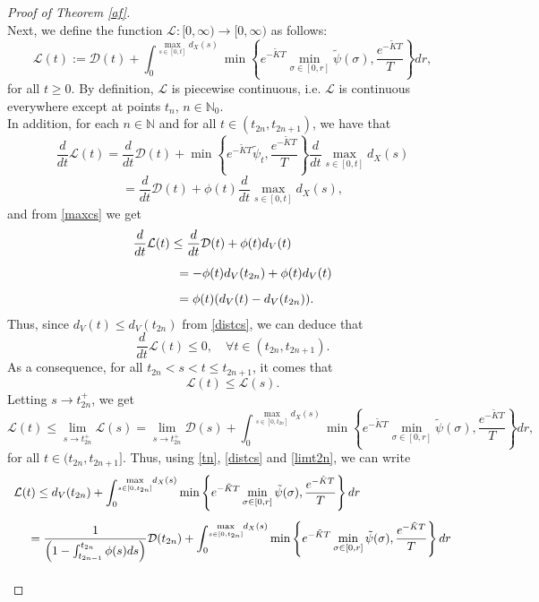 \documentclass[a4paper,11pt,oneside]{article}
\begin{document}
\begin{proof}[Proof of Theorem \ref{af}]
\begin{equation}
	\end{equation}
	Next, we define the function $\mathcal{L}:[0,\infty)\rightarrow [0,\infty)$ as follows: $$\mathcal{L}(t):=\mathcal{D}(t)+\int_{0}^{\underset{s\in [0,t]}{\max}d_{X}(s)}\min\left\{e^{- \tilde KT}\min_{\sigma\in [0,r]}\tilde \psi(\sigma),\frac{e^{-\tilde KT}}{T}\right\}dr,$$
	for all $t\geq0$. By definition, $\mathcal{L}$ is piecewise continuous, i.e. $\mathcal{L}$ is continuous everywhere except at points $t_n$, $n\in \mathbb{N}_0$. \\In addition, for each $n\in \mathbb{N}$ and for all $t\in(t_{2n},t_{2n+1}) $, we have that $$\frac{d}{dt}\mathcal{L}(t)=\frac{d}{dt}\mathcal{D}(t)+\min\left\{e^{-\tilde KT}\tilde \psi_{t},\frac{e^{-\tilde KT}}{T}\right\}\frac{d}{dt}\underset{s\in [0,t]}{\max}d_{X}(s)$$$$=\frac{d}{dt}\mathcal{D}(t)+\phi(t)\frac{d}{dt}\underset{s\in [0,t]}{\max}d_{X}(s),$$
	and from \eqref{maxcs} we get $$\begin{array}{l}
		\vspace{0.3cm}\displaystyle{\frac{d}{dt}\mathcal{L}(t)\leq \frac{d}{dt}\mathcal{D}(t)+\phi(t)d_{V}(t)}\\
		\vspace{0.3cm}\displaystyle{\hspace{1.3cm}=-\phi(t)d_V(t_{2n})+\phi(t)d_{V}(t)}\\
		\displaystyle{\hspace{1.3cm}=\phi(t)(d_V(t)-d_V(t_{2n})).}
	\end{array}$$
	Thus, since $d_V(t)\leq d_V(t_{2n})$ from \eqref{distcs}, we can deduce that
	$$\frac{d}{dt}\mathcal{L}(t)\leq 0,\quad \forall t\in (t_{2n},t_{2n+1}).$$
	As a consequence, for all $t_{2n}<s<t\leq t_{2n+1}$, it comes that
	$$\mathcal{L}(t)\leq \mathcal{L}(s).$$ 
	Letting $s\to t_{2n}^+$, we get
	$$\mathcal{L}(t)\leq \lim_{s\to t_{2n}^+}\mathcal{L}(s)=\lim_{s\to t_{2n}^+}\mathcal{D}(s)+\int_{0}^{\underset{s\in [0,t_{2n}]}{\max}d_{X}(s)}\min\left\{e^{-\tilde KT}\min_{\sigma\in [0,r]}\tilde \psi(\sigma),\frac{e^{-\tilde KT}}{T}\right\}dr,$$
	for all $t\in (t_{2n},t_{2n+1}]$. Thus, using \eqref{tn}, \eqref{distcs} and \eqref{limt2n}, we can write
	$$\begin{array}{l}
		\vspace{0.3cm}\displaystyle{\mathcal{L}(t)\leq d_V(t_{2n})+\int_{0}^{\underset{s\in [0,t_{2n}]}{\max}d_{X}(s)}\min\left\{e^{-\tilde KT}\min_{\sigma\in [0,r]}\tilde\psi(\sigma),\frac{e^{-\tilde KT}}{T}\right\}dr}\\
		\vspace{0.3cm}\displaystyle{\hspace{0.5cm}=\frac{1}{\left(1-\int_{t_{2n-1}}^{t_{2n}}\phi(s)ds\right)}\mathcal{D}(t_{2n})+\int_{0}^{\underset{s\in [0,t_{2n}]}{\max}d_{X}(s)}\min\left\{e^{-\tilde KT}\min_{\sigma\in [0,r]}\tilde\psi(\sigma),\frac{e^{-\tilde KT}}{T}\right\}dr}\\

\end{array}$$
\end{proof}
\end{document}
